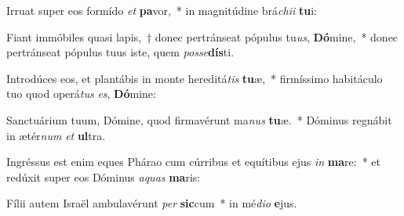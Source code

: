 \item Irruat super eos formído \textit{et} \textbf{pa}vor,~* in magnitúdine brá\textit{chi}\textit{i} \textbf{tu}i:
\item Fiant immóbiles quasi lapis,~† donec pertránseat pópulus tu\textit{us}, \textbf{Dó}mine,~* donec pertránseat pópulus tuus iste, quem \textit{pos}\textit{se}\textbf{dís}ti.
\item Introdúces eos, et plantábis in monte hereditá\textit{tis} \textbf{tu}æ,~* firmíssimo habitáculo tuo quod operá\textit{tus} \textit{es}, \textbf{Dó}mine:
\item Sanctuárium tuum, Dómine, quod firmavérunt ma\textit{nus} \textbf{tu}æ.~* Dóminus regnábit in ætér\textit{num} \textit{et} \textbf{ul}tra.
\item Ingréssus est enim eques Phárao cum cúrribus et equítibus ejus \textit{in} \textbf{ma}re:~* et redúxit super eos Dóminus \textit{a}\textit{quas} \textbf{ma}ris:
\item Fílii autem Israël ambulavérunt \textit{per} \textbf{sic}cum~* in mé\textit{di}\textit{o} \textbf{e}jus.
